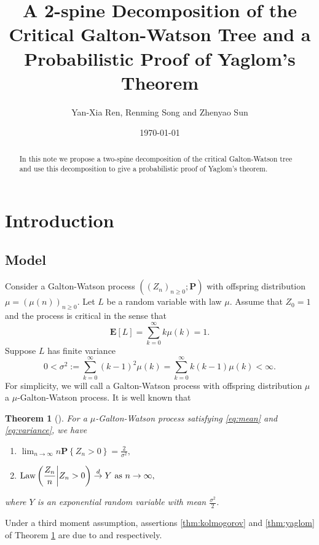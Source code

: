 \documentclass[12pt]{amsart}
\title[A 2-spine decomposition and Yaglom's theorem]
{\large A 2-spine Decomposition of the Critical Galton-Watson Tree and a Probabilistic Proof of Yaglom's Theorem}
\author{Yan-Xia Ren, Renming Song and Zhenyao Sun}
\date{\today}
\newtheorem{thm}{Theorem}[section]
\numberwithin{equation}{section}
\newcommand{\expr}[1]{\left( #1 \right)}
\newcommand{\set}[1]{\left\{ #1 \right\}}
\newcommand{\law}{\text{\rm Law}}
\newcommand{\tolaw}{\stackrel{d}{\to}}
\newcommand{\expct}{\mathbf E}
\newcommand{\bP}{\mathbf P}\newcommand{\bbP}{\mathbb P}\newcommand{\cP}{\mathcal P}
\begin{document}
\begin{abstract}
	In this note  we propose a two-spine decomposition of the critical Galton-Watson tree and use this decomposition to give a probabilistic proof of Yaglom's theorem.
\end{abstract}
\maketitle	
\section{Introduction}
\subsection{Model}
\label{sec:model}
	Consider a Galton-Watson process $((Z_n)_{n\ge0}; \bP )$ with offspring distribution $\mu=(\mu(n))_{n\ge 0}$.
	Let $L$ be a random variable with law $\mu$. Assume that $Z_0=1$ and the process is critical in the sense that
\begin{equation}
\label{eq:mean}
		\expct [L]
	=
		\sum_{k=0}^\infty k \mu(k)
	=
		1.
\end{equation}
	Suppose $L$ has finite variance
\begin{equation}
\label{eq:variance}
		0	
	<	
		\sigma^2
	:=
		\sum_{k=0}^\infty  (k-1)^2 \mu(k)
	=
		\sum_{k=0}^\infty k(k-1) \mu(k)
	<
		\infty.
\end{equation}
	For simplicity, we will call a Galton-Watson process with offspring distribution $\mu$ a $\mu$-Galton-Watson process. 
	It is well known that
\begin{thm}[\cite{kesten1966galton}]
\label{thm:kesten}
	For a $\mu$-Galton-Watson process satisfying \eqref{eq:mean} and \eqref{eq:variance}, we have
\begin{enumerate}
\item
\label{thm:kolmogorov}
	$\displaystyle \lim_{n \to \infty} n \bP \set{Z_n>0} = \frac{2}{\sigma^2},$ 
\item
\label{thm:yaglom}
	$\displaystyle	\law\expr{\frac{Z_n}{n}\bigg| Z_n>0}\tolaw Y \ \text{as }n\to\infty,$
\end{enumerate}
	where $Y$ is an exponential random variable with mean $\frac{\sigma^2}{2}$.
\end{thm}
\par
	Under a third moment assumption, assertions \eqref{thm:kolmogorov} and \eqref{thm:yaglom} of Theorem \ref{thm:kesten} are due to \cite{kolmogorov1938losung} and \cite{yaglom1947certain} respectively. 
\end{document}
